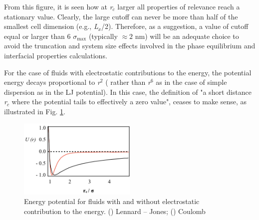 \documentclass[9pt,bestpractices]{livecoms}
\begin{document}
From this figure, it is seen how at \textit{r}$_{c}$ larger all properties of
relevance reach a stationary value. Clearly, the large cutoff can never be more
than half of the smallest cell dimension (e.g., \textit{L}$_{x}$/2).
Therefore, as a suggestion, a value of cutoff equal or larger than
6 ${\sigma}$$_{\mathrm{max}}$ (typically $\approx 2$ nm) will be an adequate choice to avoid the
truncation and system size effects involved in the phase equilibrium and
interfacial properties calculations.

For the case of fluids with electrostatic contributions to the energy, the
potential energy decays proportional to \textit{r}$^{2}$ ( rather than
\textit{r}$^{6}$ as in the case of simple dispersion as in the LJ potential).
In this case, the definition of "a short distance \textit{r}$_{c}$ where the
potential tails to effectively a zero value", ceases to make sense, as
illustrated in Fig. \ref{fig:6}. 

\begin{figure}
\includegraphics[width=0.5\textwidth]{gfx/image49.png}
\caption{Energy potential for fluids with and without electrostatic contribution to the energy. (\textcolor{color-3}{\textemdash}) Lennard -- Jones; (\textemdash) Coulomb}
\label{fig:6}
\end{figure}
\end{document}
